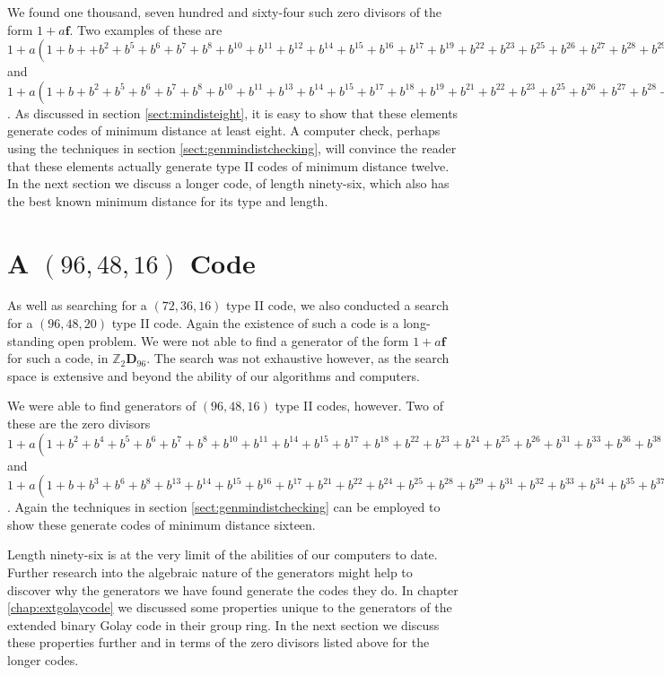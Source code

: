 We found one thousand, seven hundred and sixty-four such zero divisors of the form $1 + a \mathbf{f}$.
Two examples of these are $1 + a(1 + b + + b^2 + b^5 + b^6 + b^7 + b^8 + b^{10} + b^{11} + b^{12} + b^{14} + b^{15} + b^{16} + b^{17} + b^{19} + b^{22} + b^{23} + b^{25} + b^{26} + b^{27} + b^{28} + b^{29} + b^{30} )$ and $1 + a( 1 + b + b^2 + b^5 + b^6 + b^7 + b^8 + b^{10} + b^{11} + b^{13} + b^{14} + b^{15} + b^{17} + b^{18} + b^{19} + b^{21} + b^{22} + b^{23} + b^{25} + b^{26} + b^{27} + b^{28} + b^{29})$.
As discussed in section \ref{sect:mindisteight}, it is easy to show that these elements generate codes of minimum distance at least eight.
A computer check, perhaps using the techniques in section \ref{sect:genmindistchecking}, will convince the reader that these elements actually generate type II codes of minimum distance twelve.
In the next section we discuss a longer code, of length ninety-six, which also has the best known minimum distance for its type and length.

\section{A $(96,48,16)$ Code}
\label{sect:gen964816}
As well as searching for a $(72,36,16)$ type II code, we also conducted a search for a $(96,48,20)$ type II code.
Again the existence of such a code is a long-standing open problem.
We were not able to find a generator of the form $1 + a \mathbf{f}$ for such a code, in $\mathbb{Z}_2 \mathbf{D}_{96}$.
The search was not exhaustive however, as the search space is extensive and beyond the ability of our algorithms and computers.

We were able to find generators of $(96,48,16)$ type II codes, however.
Two of these are the zero divisors $1 + a( 1 + b^2 + b^4 + b^5 + b^6 + b^7 + b^8 + b^{10} + b^{11} + b^{14} + b^{15} + b^{17} + b^{18} + b^{22} + b^{23} + b^{24} + b^{25} + b^{26} + b^{31} + b^{33} + b^{36} + b^{38} + b^{39})$ and $1 + a ( 1 + b + b^3 + b^6 + b^8 + b^{13} + b^{14} + b^{15} + b^{16} + b^{17} + b^{21} + b^{22} + b^{24} + b^{25} + b^{28} + b^{29} + b^{31} + b^{32} + b^{33} + b^{34} + b^{35} + b^{37} + b^{39} )$.
Again the techniques in section \ref{sect:genmindistchecking} can be employed to show these generate codes of minimum distance sixteen.

Length ninety-six is at the very limit of the abilities of our computers to date.
Further research into the algebraic nature of the generators might help to discover why the generators we have found generate the codes they do.
In chapter \ref{chap:extgolaycode} we discussed some properties unique to the generators of the extended binary Golay code in their group ring.
In the next section we discuss these properties further and in terms of the zero divisors listed above for the longer codes.

